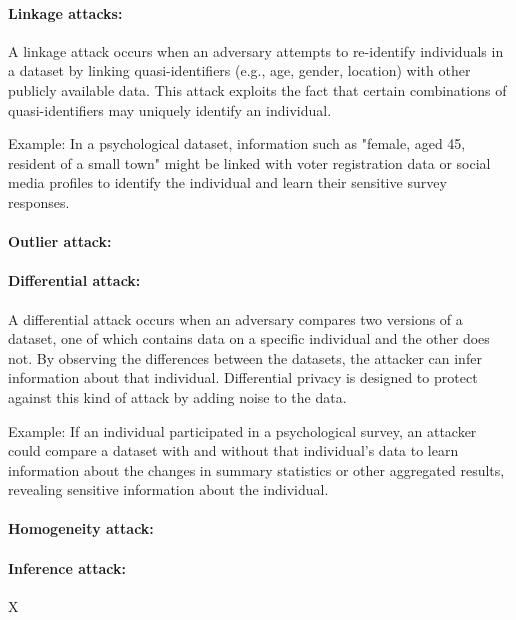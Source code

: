 \documentclass{article}
\begin{document}
\color{black}  %

\paragraph{Linkage attacks:}
A linkage attack \cite{2012_Hundepool} occurs when an adversary attempts to re-identify individuals in a dataset by linking quasi-identifiers (e.g., age, gender, location) with other publicly available data. This attack exploits the fact that certain combinations of quasi-identifiers may uniquely identify an individual.

Example: In a psychological dataset, information such as "female, aged 45, resident of a small town" might be linked with voter registration data or social media profiles to identify the individual and learn their sensitive survey responses.

\paragraph{Outlier attack:}


\paragraph{Differential attack:}
A differential attack \cite{2008_Dwork} occurs when an adversary compares two versions of a dataset, one of which contains data on a specific individual and the other does not. By observing the differences between the datasets, the attacker can infer information about that individual. Differential privacy is designed to protect against this kind of attack by adding noise to the data.

Example: If an individual participated in a psychological survey, an attacker could compare a dataset with and without that individual's data to learn information about the changes in summary statistics or other aggregated results, revealing sensitive information about the individual.

\paragraph{Homogeneity attack:}

\paragraph{Inference attack:}
X
\newline
\end{document}
